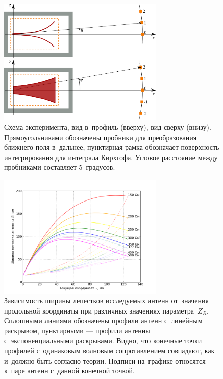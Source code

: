 \begin{figure}[p]
\centering
\includegraphics[width=0.7\textwidth]{graphics/directional-patterns-experiment-scheme}
\caption{
    Схема эксперимента, вид в~профиль (вверху), вид сверху (внизу).
    Прямоугольниками обозначены пробники для преобразования ближнего поля
    в~дальнее, пунктирная рамка обозначает поверхность интегрирования для
    интеграла Кирхгофа. Угловое расстояние между пробниками составляет
    5~градусов.}
\label{fig:DirectionalPatternExperiment}
\end{figure}

\begin{figure}[p]
\centering
\includegraphics[width=0.7\textwidth]{graphics/directional-patterns-profile-widths}
\caption{
    Зависимость ширины лепестков исследуемых антенн от~значения продольной
    координаты при различных значениях параметра~$Z_R$. Сплошными линиями
    обозначены профили антенн с~линейным раскрывом, пунктирными --- профили
    антенны с~экспоненциальными раскрывами. Видно, что конечные точки профилей
    с~одинаковым волновым сопротивлением совпадают, как и~должно быть согласно
    теории. Подписи на~графике относятся к~паре антенн с~данной конечной точкой.}
\label{fig:ProfileWidths}
\end{figure}

